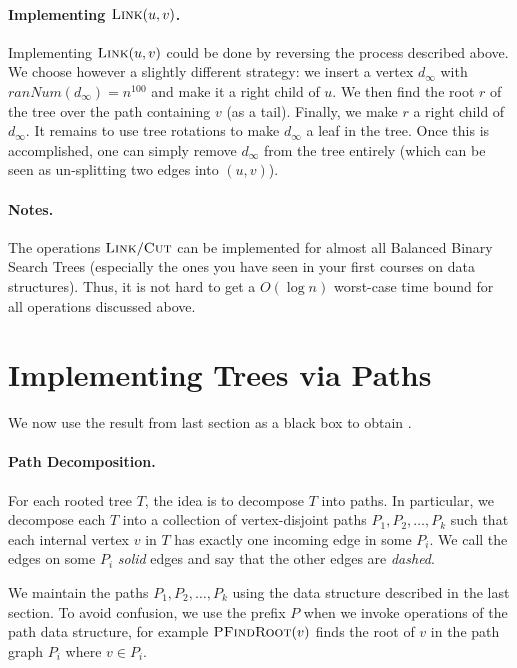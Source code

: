\paragraph{Implementing $\textsc{Link}(u,v)$.} Implementing $\textsc{Link}(u,v)$ could be done by reversing the process described above. We choose however a slightly different strategy: we insert a vertex $d_{\infty}$ with $ranNum(d_{\infty}) = n^{100}$ and make it a right child of $u$. We then find the root $r$ of the tree over the path containing $v$ (as a tail). Finally, we make $r$ a right child of $d_{\infty}$. It remains to use tree rotations to make $d_{\infty}$ a leaf in the tree.  Once this is accomplished, one can simply remove $d_{\infty}$ from the tree entirely (which can be seen as un-splitting two edges into $(u,v)$).  

\paragraph{Notes.} The operations $\textsc{Link}/ \textsc{Cut}$ can be implemented for almost all Balanced Binary Search Trees (especially the ones you have seen in your first courses on data structures). Thus, it is not hard to get a $O(\log n)$ worst-case time bound for all operations discussed above.

\section{Implementing Trees via Paths}

We now use the result from last section as a black box to obtain .

\paragraph{Path Decomposition.} For each rooted tree $T$, the idea is to decompose $T$ into paths. In particular, we decompose each $T$ into a collection of vertex-disjoint paths $P_1, P_2, \dots, P_k$ such that each internal vertex $v$ in $T$ has exactly one incoming edge in some $P_i$. We call the edges on some $P_i$  \emph{solid} edges and say that the other edges are \emph{dashed}. 

We maintain the paths $P_1, P_2, \dots, P_k$ using the data structure described in the last section. To avoid confusion, we use the prefix $P$ when we invoke operations of the path data structure, for example $\textsc{PFindRoot}(v)$ finds the root of $v$ in the path graph $P_i$ where $v \in P_i$.

